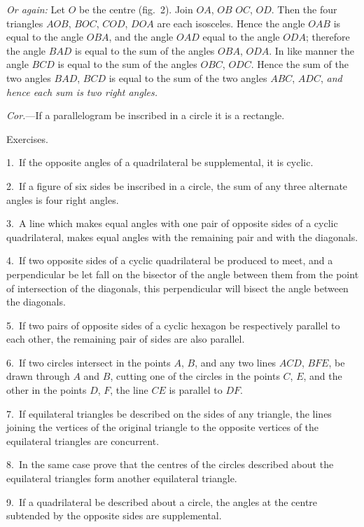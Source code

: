 \documentclass[oneside]{book}
\newcommand\exhead[1]{
\Needspace*{5\baselineskip}\begin{center}
\textsf{#1}
\end{center}
}
\begin{document}
\emph{Or again:} Let $O$ be the centre (fig.~2). Join $OA$, $OB$
$OC$, $OD$. Then the four triangles $AOB$, $BOC$, $COD$,
$DOA$ are each isosceles. Hence the angle $OAB$ is
equal to the angle $OBA$, and the angle $OAD$ equal to
the angle $ODA$; therefore the angle $BAD$ is equal to
the sum of the angles $OBA$, $ODA$. In like manner
the angle $BCD$ is equal to the sum of the angles $OBC$,
$ODC$. Hence the sum of the two angles $BAD$, $BCD$
is equal to the sum of the two angles $ABC$, $ADC$, \emph{and
hence each sum is two right angles.}

\emph{Cor.}---If a parallelogram be inscribed in a circle it is
a rectangle.

\exhead{Exercises.}

\begin{footnotesize}
1.~If the opposite angles of a quadrilateral be supplemental, it
is cyclic.

2.~If a figure of six sides be inscribed in a circle, the sum of
any three alternate angles is four right angles.

3.~A line which makes equal angles with one pair of opposite
sides of a cyclic quadrilateral, makes equal angles with the remaining
pair and with the diagonals.


4.~If two opposite sides of a cyclic quadrilateral be produced to
meet, and a perpendicular be let fall on the bisector of the angle
between them from the point of intersection of the diagonals, this
perpendicular will bisect the angle between the diagonals.

5.~If two pairs of opposite sides of a cyclic hexagon be respectively
parallel to each other, the remaining pair of sides are also
parallel.

6.~If two circles intersect in the points $A$, $B$, and any two lines
$ACD$, $BFE$, be drawn through $A$ and $B$, cutting one of the circles
in the points $C$, $E$, and the other in the points $D$, $F$, the line $CE$
is parallel to $DF$.

7.~If equilateral triangles be described on the sides of any
triangle, the lines joining the vertices of the original triangle
to the opposite vertices of the equilateral triangles are concurrent.

8.~In the same case prove that the centres of the circles described
about the equilateral triangles form another equilateral
triangle.

9.~If a quadrilateral be described about a circle, the angles at
the centre subtended by the opposite sides are supplemental.


\end{footnotesize}
\end{document}
